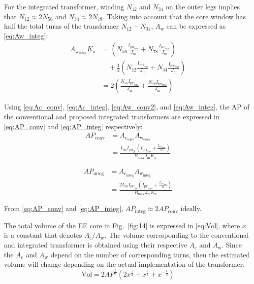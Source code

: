 \documentclass[lettersize,journal]{IEEEtran}
\begin{document}
For the integrated transformer, winding $N_{12}$ and $N_{34}$ on the outer legs implies that $N_{12} \approx 2N_{56}$ and $N_{34} \approx 2N_{78}$. Taking into account that the core window has half the total turns of the transformer $N_{12}-N_{34}$, $A_{\mathrm{w}}$ can be expressed as \eqref{eq:Aw_integ}:
\begin{align}
\label{eq:Aw_integ}
A_{\mathrm{w}_{\mathrm{integ}}} K_{\mathrm{u}} &= \left(N_{56} \frac{I_{\mathrm{pri}_{\mathrm{rms}}}}{J_{\mathrm{m}}} + N_{78} \frac{I_{\mathrm{sec}_{\mathrm{rms}}}}{J_{\mathrm{m}}}\right) \nonumber \\
&\quad + \frac{1}{2}\left(N_{12} \frac{I_{\mathrm{pri}_{\mathrm{rms}}}}{J_{\mathrm{m}}} + N_{34} \frac{I_{\mathrm{sec}_{\mathrm{rms}}}}{J_{\mathrm{m}}}\right) \nonumber \\
&= 2 \left( \frac{N_{56} I_{\mathrm{pri}_{\mathrm{rms}}}}{J_{\mathrm{m}}} + \frac{N_{78} I_{\mathrm{sec}_{\mathrm{rms}}}}{J_{\mathrm{m}}} \right) 
\end{align}

Using \eqref{eq:Ac_conv}, \eqref{eq:Ac_integ}, \eqref{eq:Aw_conv2}, and \eqref{eq:Aw_integ}, the AP of the conventional and proposed integrated transformers are expressed in \eqref{eq:AP_conv} and \eqref{eq:AP_integ} respectively:
\begin{align}
\label{eq:AP_conv}
AP_{\mathrm{conv}} &= A_{\mathrm{c}_{\mathrm{conv}}} A_{\mathrm{w}_{\mathrm{conv}}} \nonumber \\ &=\frac{L_{\mathrm{m}} I_{\mathrm{pri}_{\mathrm{pk}}} \left( I_{\mathrm{pri}_{\mathrm{rms}}} + \frac{I_{\mathrm{sec}_{\mathrm{rms}}}}{n} \right)}{B_{\mathrm{max}} J_{\mathrm{m}} K_{\mathrm{u}}}
\end{align}

\begin{align}
\label{eq:AP_integ}
AP_{\mathrm{integ}} &= A_{\mathrm{c}_{\mathrm{integ}}} A_{\mathrm{w}_{\mathrm{integ}}} \nonumber \\ &= \frac{2 L_{\mathrm{m}} I_{\mathrm{pri}_{\mathrm{pk}}} \left( I_{\mathrm{pri}_{\mathrm{rms}}} + \frac{I_{\mathrm{sec}_{\mathrm{rms}}}}{n} \right)}{B_{\mathrm{max}} J_{\mathrm{m}} K_{\mathrm{u}}}
\end{align}

From \eqref{eq:AP_conv} and \eqref{eq:AP_integ}, $AP_{\mathrm{integ}} \approx 2 AP_{\mathrm{conv}}$ ideally.

The total volume of the EE core in Fig.~\ref{fig:14} is expressed in \eqref{eq:Vol}, where $x$ is a constant that denotes $A_{\mathrm{c}}/A_{\mathrm{w}}$. The volume corresponding to the conventional and integrated transformer is obtained using their respective $A_{\mathrm{c}}$ and $A_{\mathrm{w}}$. Since the $A_{\mathrm{c}}$ and $A_{\mathrm{w}}$ depend on the number of corresponding turns, then the estimated volume will change depending on the actual implementation of the transformer.
\begin{equation}
\label{eq:Vol}
\mathrm{Vol} = 2 AP^{\frac{3}{4}} \left(2 x^{\frac{1}{4}} + x^{\frac{3}{4}} + x^{-\frac{1}{4}}\right)
\end{equation}
\end{document}
